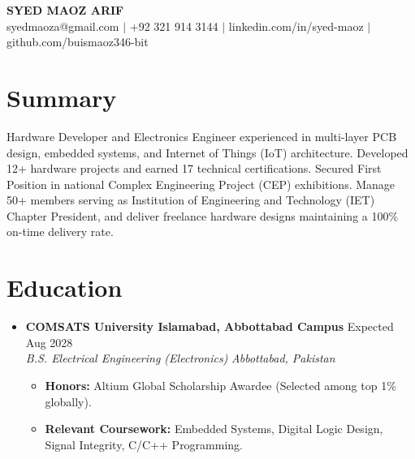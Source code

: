 \documentclass[letterpaper,10pt]{article}
\newcommand{\resumeItem}[1]{\item\small{#1}}
\newcommand{\resumeSubheading}[4]{
  \item
    \textbf{#1} \hfill #2 \\
    \textit{\small#3} \hfill \textit{\small #4}
}
\begin{document}
\raggedright %
\pagestyle{empty}

\begin{center}
    {\Huge \textbf{SYED MAOZ ARIF}} \\ \vspace{5pt}
    \small 
    syedmaoza@gmail.com $|$ +92 321 914 3144 $|$ linkedin.com/in/syed-maoz $|$ github.com/buismaoz346-bit
\end{center}

\vspace{-0.5em}

\section{Summary}
\vspace{2pt}
\small{Hardware Developer and Electronics Engineer experienced in multi-layer PCB design, embedded systems, and Internet of Things (IoT) architecture. Developed 12+ hardware projects and earned 17 technical certifications. Secured First Position in national Complex Engineering Project (CEP) exhibitions. Manage 50+ members serving as Institution of Engineering and Technology (IET) Chapter President, and deliver freelance hardware designs maintaining a 100\% on-time delivery rate.}

\section{Education}
  \begin{itemize}[leftmargin=0in, label={}]
    \resumeSubheading
      {COMSATS University Islamabad, Abbottabad Campus}{Expected Aug 2028}
      {B.S. Electrical Engineering (Electronics)}{Abbottabad, Pakistan}
      \vspace{-4pt}
      \begin{itemize}[leftmargin=0.2in, label=\textbullet, itemsep=1pt]
        \resumeItem{\textbf{Honors:} Altium Global Scholarship Awardee (Selected among top 1\% globally).}
        \resumeItem{\textbf{Relevant Coursework:} Embedded Systems, Digital Logic Design, Signal Integrity, C/C++ Programming.}
      \end{itemize}
  \end{itemize}

\end{document}
